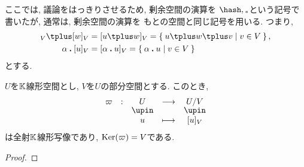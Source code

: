 \begin{remark}
  ここでは,
  議論をはっきりさせるため,
  剰余空間の演算を
  $\pplus,\aact$という記号で書いたが,
  通常は,
  剰余空間の演算を
  もとの空間と同じ記号を用いる.
  つまり,
  \begin{align*}
    [u]_V\plus [w]_V&=[u \plus w]_V=\Set{u \plus w \plus v|v\in V}, \\
    \alpha \act [u]_V&=[\alpha \act u]_V=\Set{\alpha\act u|v\in V}
  \end{align*}
  とする.
\end{remark}

\begin{prop}
$U$を$\mathbb{K}$線形空間とし,
$V$を$U$の部分空間とする.
このとき,
\begin{align*}
\shazo{\varpi}{U}{U/V}
{u}{[u]_V}
\end{align*}
は全射$\mathbb{K}$線形写像であり,
$\operatorname{Ker}(\varpi)=V$である.
\end{prop}
\begin{proof}\end{proof}


